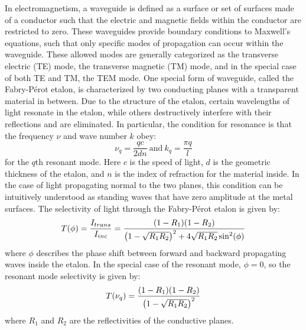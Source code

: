\documentclass{report}
\begin{document}
        In electromagnetism, a waveguide is defined as a surface or set of surfaces made of a conductor such that the electric and magnetic fields within the conductor are restricted to zero. These waveguides provide boundary conditions to Maxwell's equations, such that only specific modes of propagation can occur within the waveguide. These allowed modes are generally categorized as the transverse electric (TE) mode, the transverse magnetic (TM) mode, and in the special case of both TE and TM, the TEM mode.\cite{griffiths1999} One special form of waveguide, called the Fabry-P\'erot etalon, is characterized by two conducting planes with a transparent material in between. Due to the structure of the etalon, certain wavelengths of light resonate in the etalon, while others destructively interfere with their reflections and are eliminated.\cite{Ismail2016} In particular, the condition for resonance is that the frequency $\nu$ and wave number $k$ obey:
        \begin{equation}
            \nu_q=\frac{qc}{2dn}\ \mathrm{and}\ k_q=\frac{\pi q}{l}
        \end{equation}
        for the $q$th resonant mode. Here $c$ is the speed of light, $d$ is the geometric thickness of the etalon, and $n$ is the index of refraction for the material inside.\cite{Pollnau2018} In the case of light propagating normal to the two planes, this condition can be intuitively understood as standing waves that have zero amplitude at the metal surfaces. The selectivity of light through the Fabry-P\'erot etalon is given by:
        \begin{equation}
            T(\phi)=\frac{I_{trans}}{I_{inc}}=\frac{\qty(1-R_1)\qty(1-R_2)}{\qty(1-\sqrt{R_1R_2})^2+4\sqrt{R_1R_2}\sin^2(\phi)}
        \end{equation}
        where $\phi$ describes the phase shift between forward and backward propagating waves inside the etalon. In the special case of the resonant mode, $\phi=0$, so the resonant mode selectivity is given by:
        \begin{equation}
            T\qty(\nu_q)=\frac{\qty(1-R_1)\qty(1-R_2)}{\qty(1-\sqrt{R_1R_2})^2}
        \end{equation}
        where $R_1$ and $R_2$ are the reflectivities of the conductive planes.\cite{siegman1986}
        
\end{document}
